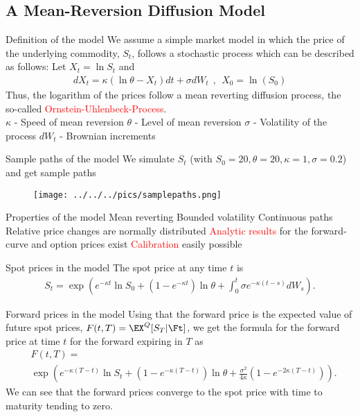 \subsection[Mean-Reversion Model]{A Mean-Reversion Diffusion Model}


Definition of the model
We assume a simple market model in which the price of the underlying commodity, $S_t$, follows a stochastic process which can be described as follows:
Let $X_t = \ln S_t$ and
	\begin{align*}
		dX_t = \kappa (\ln \theta - X_t)dt + \sigma dW_t~~,~~X_0 = \ln(S_0)
	\end{align*}
Thus, the logarithm of the prices follow a mean reverting diffusion process, the so-called \textcolor{red}{Ornstein-Uhlenbeck-Process}.\\
	$\kappa$ - Speed of mean reversion
	$\theta$ - Level of mean reversion
	$\sigma$ - Volatility of the process
	$dW_t$ - Brownian increments


Sample paths of the model
We simulate $S_t$ (with $S_0=20, \theta = 20, \kappa = 1, \sigma = 0.2$) and get sample paths
\begin{figure}
	\centering
		\texttt{[image: ../../../pics/samplepaths.png]}
	\label{fig:samplepahts}
\end{figure}


Properties of the model
	Mean reverting
	Bounded volatility
	Continuous paths
	Relative price changes are normally distributed
	\textcolor{red}{Analytic results} for the forward-curve and option prices exist
	\textcolor{red}{Calibration} easily possible


Spot prices in the model
The spot price at any time $t$ is
	\begin{align*}
		S_t = \exp \left( e^{-\kappa t} \ln S_0 + (1-e^{-\kappa t}) \ln \theta + \int_0^t{\sigma e^{-\kappa (t-s)}}dW_s \right).
	\end{align*}


Forward prices in the model
	Using that the forward price is the expected value of future spot prices,
	$F(t,T) = \EX^{Q}[S_T | \Ft]$,
	we get the formula for the forward price at time $t$ for the forward expiring in $T$ as
	\begin{align*}
		&F(t,T) = \\
		&\exp \left( e^{-\kappa(T-t)} \ln S_t + (1-e^{-\kappa(T-t)}) \ln \theta + \frac{\sigma^2}{4\kappa}(1-e^{-2\kappa(T-t)}) \right).
	\end{align*}
	We can see that the forward prices converge to the spot price with time to maturity tending to zero.


